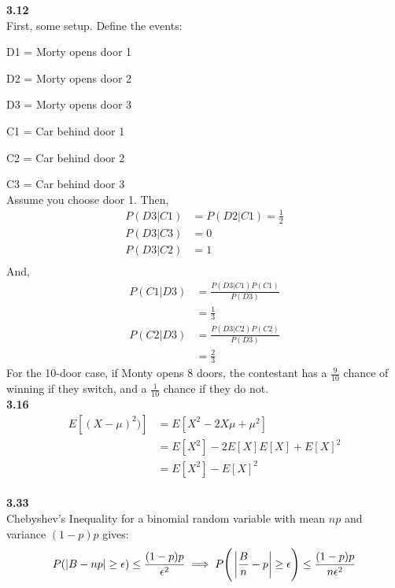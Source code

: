 \documentclass[letterpaper,12pt]{article}
\theoremstyle{definition}
\begin{document}
\noindent\textbf{3.12}\\
\noindent First, some setup. Define the events:\par
	D1 = Morty opens door 1\par
	D2 = Morty opens door 2\par
	D3 = Morty opens door 3\par
	C1 = Car behind door 1\par
	C2 = Car behind door 2\par
	C3 = Car behind door 3\newline\\
\noindent Assume you choose door 1. Then,
\begin{align*}
P(D3 | C1) &= P(D2 | C1) = \frac{1}{2}\\
P(D3 | C3) &= 0\\
P(D3 | C2) &= 1\\
\end{align*}
And,
\begin{equation*}
\begin{split}
P(C1 | D3) &= \frac{P(D3 | C1)P(C1)}{P(D3)}\\
&= \frac{1}{3}\\
P(C2 | D3) &= \frac{P(D3 | C2)P(C2)}{P(D3)}\\
&= \frac{2}{3}
\end{split}
\end{equation*}
For the 10-door case, if Monty opens 8 doors, the contestant has a $\frac{9}{10}$ chance of winning if they switch, and a $\frac{1}{10}$ chance if they do not.\newline\\
\noindent\textbf{3.16}
\noindent
\begin{align*}
E[(X-\mu)^2)] &= E[X^2 - 2X\mu + \mu^2]\\
&= E[X^2] - 2E[X]E[X] + E[X]^2\\
&= E[X^2] - E[X]^2
\end{align*}\newline\\
\noindent\textbf{3.33}\\
\noindent Chebyshev's Inequality for a binomial random variable with mean $np$ and variance $(1-p)p$ gives:
\begin{equation*}
P(\left|B-np\right| \geq \epsilon) \leq \frac{(1-p)p}{\epsilon^2}\\
\implies P\Bigg(\left|{\frac{B}{n}-p}\right| \geq \epsilon\Bigg) \leq \frac{(1-p)p}{n\epsilon^2}
\end{equation*}\newline\\
\end{document}
